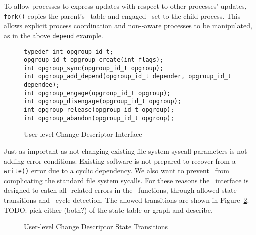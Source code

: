 To allow processes to express updates with respect to other processes'
updates, \verb+fork()+ copies the parent's \opgroup\ table and engaged
\opgroup\ set to the child process. This allows explicit process coordination
and non-\opgroup{}-aware processes to be manipulated, as in the above
\texttt{depend} example.

\begin{figure}[htb]
\begin{scriptsize}
\texttt{typedef int opgroup\_id\_t;}\\
\texttt{opgroup\_id\_t opgroup\_create(int flags);}\\
\texttt{int opgroup\_sync(opgroup\_id\_t opgroup);}\\
\texttt{int opgroup\_add\_depend(opgroup\_id\_t depender, opgroup\_id\_t dependee);}\\
\texttt{int opgroup\_engage(opgroup\_id\_t opgroup);}\\
\texttt{int opgroup\_disengage(opgroup\_id\_t opgroup);}\\
\texttt{int opgroup\_release(opgroup\_id\_t opgroup);}\\
\texttt{int opgroup\_abandon(opgroup\_id\_t opgroup);}
\end{scriptsize}
\caption{\label{fig:opgroup-interface} User-level Change Descriptor Interface}
\end{figure}

Just as important as not changing existing file system syscall
parameters is not adding error conditions. Existing software is not
prepared to recover from a \texttt{write()} error due to a cyclic
dependency. We also want to prevent \opgroups\ from complicating the
standard file system sycalls. For these reasons the \opgroup\
interface is designed to catch all \opgroup{}-related errors in the
\opgroup\ functions, through allowed state transitions and
\opgroupAddDepend\ cycle detection. The allowed transitions are shown
in Figure~\ref{fig:opgroup-transitions}. TODO: pick either (both?) of
the state table or graph and describe.

\begin{figure}[htb]
\caption{\label{fig:opgroup-transitions} User-level Change Descriptor State Transitions}
\end{figure}

